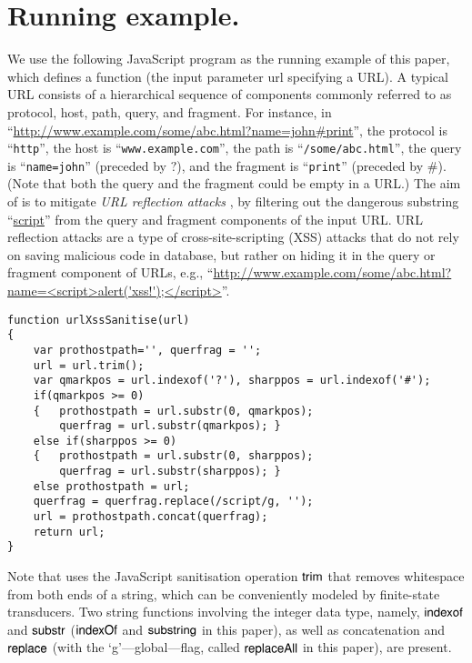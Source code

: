 
\section{Running example.}
We use the following JavaScript program as the running example of this paper,
which defines a function {\urlxsssanitise} (the input parameter {\sf url} specifying a URL). A typical URL consists of a hierarchical sequence of components commonly referred to as protocol, host, path, query, and fragment. For instance, in ``\url{http://www.example.com/some/abc.html?name=john#print}'', the protocol is ``{\tt http}'', the host is ``{\tt www.example.com}'', the path is ``{\tt /some/abc.html}'', the query is ``{\tt name=john}'' (preceded by $?$), and the fragment is ``{\tt print}'' (preceded by $\#$). (Note that both the query and the fragment could be empty in a URL.) The aim of {\urlxsssanitise} is to mitigate \emph{URL reflection attacks} \cite{url-reflect}, by filtering out the dangerous substring ``\url{script}'' from the query and fragment components of  the input URL. URL reflection attacks are a type of cross-site-scripting (XSS) attacks that do not rely on saving malicious code in database, but rather on hiding it in the query or fragment component of URLs, e.g., ``\url{http://www.example.com/some/abc.html?name=<script>alert('xss!');</script>}''.
{\small
\begin{verbatim}
function urlXssSanitise(url)
{
    var prothostpath='', querfrag = '';
    url = url.trim();
    var qmarkpos = url.indexof('?'), sharppos = url.indexof('#');
    if(qmarkpos >= 0) 
    {   prothostpath = url.substr(0, qmarkpos);
        querfrag = url.substr(qmarkpos); }
    else if(sharppos >= 0)
    {   prothostpath = url.substr(0, sharppos);
        querfrag = url.substr(sharppos); }
    else prothostpath = url;
    querfrag = querfrag.replace(/script/g, '');
    url = prothostpath.concat(querfrag);
    return url;
}
\end{verbatim}
}
%
\noindent Note that {\urlxsssanitise} uses the JavaScript sanitisation operation $\sf trim$ that removes whitespace from both ends of a string, which can be conveniently modeled by finite-state transducers. Two string functions involving the integer data type, namely, $\sf indexof$ and $\sf substr$ ($\mathsf{indexOf}$ and $\mathsf{substring}$ in this paper), as well as concatenation and $\sf replace$ (with the `g'---global---flag, called $\mathsf{replaceAll}$ in this paper), are present. 

